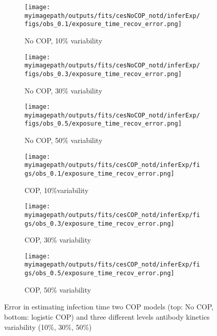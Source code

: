 \begin{figure}[H]

    \centering
    \begin{subfigure}{0.31\textwidth}
        \centering
        \texttt{[image: \\myimagepath/outputs/fits/cesNoCOP\_notd/inferExp/figs/obs\_0.1/exposure\_time\_recov\_error.png]}
        \caption{No COP, 10\% variability \label{fit1:inf}}
    \end{subfigure}
    \begin{subfigure}{0.31\textwidth}
        \centering
        \texttt{[image: \\myimagepath/outputs/fits/cesNoCOP\_notd/inferExp/figs/obs\_0.3/exposure\_time\_recov\_error.png]}
        \caption{No COP, 30\% variability}
    \end{subfigure}
    \begin{subfigure}{0.31\textwidth}
        \centering
        \texttt{[image: \\myimagepath/outputs/fits/cesNoCOP\_notd/inferExp/figs/obs\_0.5/exposure\_time\_recov\_error.png]}
        \caption{No COP, 50\% variability}
    \end{subfigure}
    
  \begin{subfigure}{0.31\textwidth}
        \centering
        \texttt{[image: \\myimagepath/outputs/fits/cesCOP\_notd/inferExp/figs/obs\_0.1/exposure\_time\_recov\_error.png]}
        \caption{ COP, 10\%variability}
    \end{subfigure}
    \begin{subfigure}{0.31\textwidth}
        \centering
        \texttt{[image: \\myimagepath/outputs/fits/cesCOP\_notd/inferExp/figs/obs\_0.3/exposure\_time\_recov\_error.png]}
        \caption{ COP, 30\% variability}
    \end{subfigure}
    \begin{subfigure}{0.31\textwidth}
        \centering
        \texttt{[image: \\myimagepath/outputs/fits/cesCOP\_notd/inferExp/figs/obs\_0.5/exposure\_time\_recov\_error.png]}
        \caption{ COP, 50\% variability}
    \end{subfigure}
    
    \caption{Error in estimating infection time two COP models (top: No COP, bottom: logistic COP) and three different levels antibody kinetics variability (10\%, 30\%, 50\%) \label{fit2:exp_time_error}}
\end{figure}



